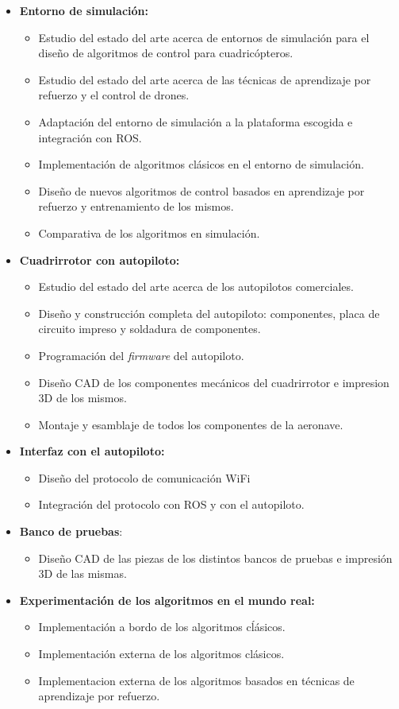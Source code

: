  \begin{itemize}
 	\item \textbf{Entorno de simulación:}
 	\begin{itemize}
 		\item Estudio del estado del arte acerca de entornos de simulación para el diseño de algoritmos de control para cuadricópteros.
 		\item Estudio del estado del arte acerca de las técnicas de aprendizaje por refuerzo y el control de drones.
 		\item Adaptación del entorno de simulación a la plataforma escogida e integración con ROS.
 		\item Implementación de algoritmos clásicos en el entorno de simulación.
 		\item Diseño de nuevos algoritmos de control basados en aprendizaje por refuerzo y entrenamiento de los mismos.
 		\item Comparativa de los algoritmos en simulación.
 	\end{itemize}
 	\item \textbf{Cuadrirrotor con autopiloto:}
 	\begin{itemize}
 		\item Estudio del estado del arte acerca de los autopilotos comerciales.
 		\item Diseño y construcción completa del autopiloto: componentes, placa de circuito impreso y soldadura de componentes.
 		\item Programación del \textit{firmware} del autopiloto.
 		\item Diseño CAD de los componentes mecánicos del cuadrirrotor e impresion 3D de los mismos.
 		\item Montaje y esamblaje de todos los componentes de la aeronave.  
 	\end{itemize}
 	\item \textbf{Interfaz con el autopiloto:}
 	\begin{itemize}
		\item Diseño del protocolo de comunicación WiFi
		\item Integración del protocolo con ROS y con el autopiloto.
	\end{itemize}
	\item \textbf{Banco de pruebas}:
		\begin{itemize}
			\item Diseño CAD de las piezas de los distintos bancos de pruebas e impresión 3D de las mismas. 
		\end{itemize}
	\item \textbf{Experimentación de los algoritmos en el mundo real:} 
		\begin{itemize}
			\item Implementación a bordo de los algoritmos cĺásicos.
			\item Implementación externa de los algoritmos clásicos.
			\item Implementacion externa de los algoritmos basados en técnicas de aprendizaje por refuerzo. 
		\end{itemize}
 \end{itemize}
